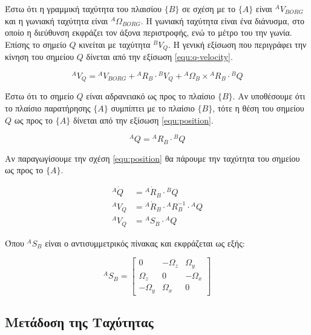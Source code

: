 Έστω ότι η γραμμική ταχύτητα του πλαισίου $\{Β\}$ σε σχέση με το $\{Α\}$ είναι $^AV_{BORG}$ και η γωνιακή ταχύτητα είναι $^A\Omega_{BORG}$. Η γωνιακή ταχύτητα είναι ένα διάνυσμα, στο οποίο η διεύθυνση εκφράζει τον άξονα περιστροφής, ενώ το μέτρο του την γωνία. Επίσης το σημείο $Q$ κινείται με ταχύτητα $^BV_Q$. Η γενική εξίσωση που περιγράφει την κίνηση του σημείου $Q$ δίνεται από την εξίσωση \ref{equ:q-velocity}.

\begin{equation}
    ^AV_Q = {}^AV_{BORG} + {}^AR_B \cdot {}^BV_Q + {}^A\Omega_B \times {}^AR_B
    \cdot {}^BQ
    \label{equ:q-velocity}
\end{equation}

Έστω ότι το σημείο $Q$ είναι αδρανειακό ως προς το πλαίσιο $\{Β\}$. Αν υποθέσουμε ότι το πλαίσιο παρατήρησης $\{Α\}$ συμπίπτει με το πλαίσιο $\{Β\}$, τότε η θέση του σημείου $Q$ ως προς το $\{Α\}$ δίνεται από την εξίσωση \ref{equ:position}.

\begin{equation}
    ^AQ = {}^AR_B \cdot {}^BQ
    \label{equ:position}
\end{equation}

Αν παραγωγίσουμε την σχέση \ref{equ:position} θα πάρουμε την ταχύτητα του σημείου ως προς το $\{Α\}$.

\begin{equation}
    \begin{split}
        ^A\dot{Q} & = {}^A\dot{R}_B \cdot {}^BQ\\
        ^AV_Q & = {}^A\dot{R}_B \cdot {}^AR^{-1}_B \cdot {}^AQ\\
        ^AV_Q & = {}^AS_B \cdot {}^AQ
    \end{split}
    \label{equ:velocity}
\end{equation}

Όπου $^AS_B$ είναι ο αντισυμμετρικός πίνακας και εκφράζεται ως εξής:

\begin{equation}
    ^AS_B  =
    \begin{bmatrix}
        0 & -\Omega_z & \Omega_y\\
        \Omega_z & 0 & -\Omega_x\\
        -\Omega_y & \Omega_x & 0
    \end{bmatrix}
    \label{equ:skew-symmetric}
\end{equation}

\subsection{Μετάδοση της Ταχύτητας}


